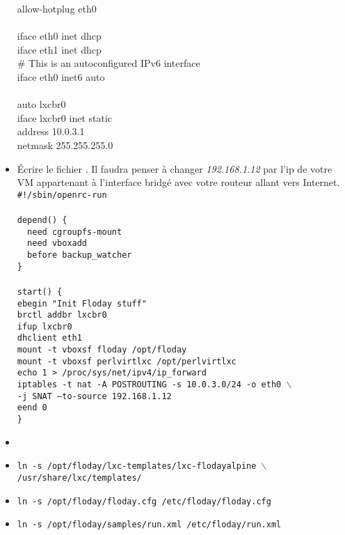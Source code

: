 \begin{itemize}
{allow-hotplug eth0\\
\\
iface eth0 inet dhcp\\
iface eth1 inet dhcp\\
\# This is an autoconfigured IPv6 interface\\
iface eth0 inet6 auto\\
\\
auto lxcbr0\\
iface lxcbr0 inet static\\
	address 10.0.3.1\\
	netmask 255.255.255.0\\
		}
	\item Écrire le fichier .
	Il faudra penser à changer \emph{192.168.1.12} par l'ip de votre VM appartenant à l'interface bridgé avec votre routeur allant vers Internet.\\
	{\tt \#!/sbin/openrc-run\\
\\
depend() \{\\
	~~need cgroupfs-mount\\
	~~need vboxadd\\
	~~before backup\_watcher\\
\}\\
\\
start() \{\\
	ebegin "Init Floday stuff"\\
	brctl addbr lxcbr0\\
	ifup lxcbr0\\
	dhclient eth1\\
	mount -t vboxsf floday /opt/floday\\
	mount -t vboxsf perlvirtlxc /opt/perlvirtlxc\\
	echo 1 > /proc/sys/net/ipv4/ip\_forward\\
	iptables -t nat -A POSTROUTING -s 10.0.3.0/24 -o eth0 $\backslash$\\
	-j SNAT --to-source 192.168.1.12\\
	eend 0\\
	\}
}
	\item {}
	\item {\tt ln -s /opt/floday/lxc-templates/lxc-flodayalpine $\backslash$\\ /usr/share/lxc/templates/}
	\item {\tt ln -s /opt/floday/floday.cfg /etc/floday/floday.cfg}
	\item {\tt ln -s /opt/floday/samples/run.xml /etc/floday/run.xml}

\end{itemize}
